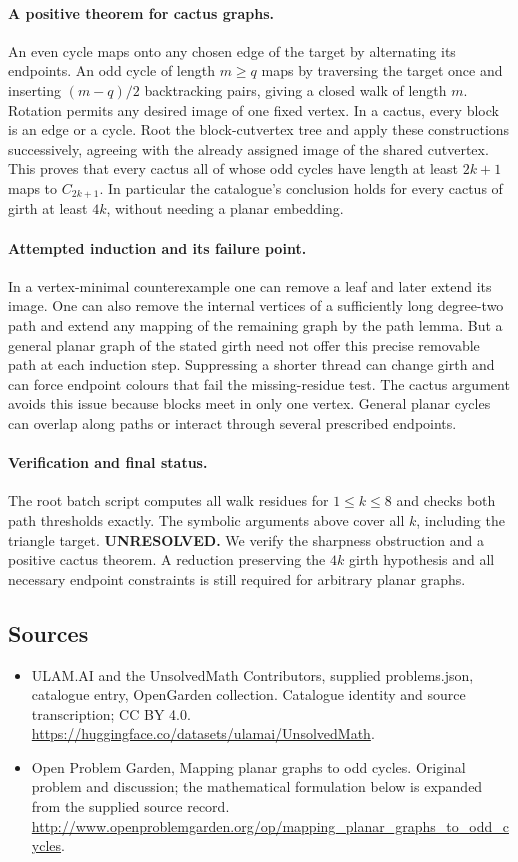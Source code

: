 \documentclass[11pt,a4paper]{article}
\begin{document}
\paragraph{A positive theorem for cactus graphs.}
An even cycle maps onto any chosen edge of the target by alternating its
endpoints. An odd cycle of length $m\ge q$ maps by traversing the target
once and inserting $(m-q)/2$ backtracking pairs, giving a closed walk of
length $m$. Rotation permits any desired image of one fixed vertex.
In a cactus, every block is an edge or a cycle. Root the block-cutvertex
tree and apply these constructions successively, agreeing with the
already assigned image of the shared cutvertex. This proves that every
cactus all of whose odd cycles have length at least $2k+1$ maps to
$C_{2k+1}$. In particular the catalogue's conclusion holds for every
cactus of girth at least $4k$, without needing a planar embedding.

\paragraph{Attempted induction and its failure point.}
In a vertex-minimal counterexample one can remove a leaf and later extend
its image. One can also remove the internal vertices of a sufficiently
long degree-two path and extend any mapping of the remaining graph by
the path lemma. But a general planar graph of the stated girth need not
offer this precise removable path at each induction step. Suppressing a
shorter thread can change girth and can force endpoint colours that fail
the missing-residue test. The cactus argument avoids this issue because
blocks meet in only one vertex. General planar cycles can overlap along
paths or interact through several prescribed endpoints.

\paragraph{Verification and final status.}
The root batch script computes all walk residues for $1\le k\le8$ and
checks both path thresholds exactly. The symbolic arguments above cover
all $k$, including the triangle target. \textbf{UNRESOLVED.} We verify the
sharpness obstruction and a positive cactus theorem. A reduction preserving
the $4k$ girth hypothesis and all necessary endpoint constraints is still
required for arbitrary planar graphs.

\subsection{Sources}
\begin{itemize}
\item[S1] ULAM.AI and the UnsolvedMath Contributors, supplied problems.json, catalogue entry, OpenGarden collection. Catalogue identity and source transcription; CC BY 4.0.
\url{https://huggingface.co/datasets/ulamai/UnsolvedMath}.
\item[S2] Open Problem Garden, Mapping planar graphs to odd cycles. Original problem and discussion; the mathematical formulation below is expanded from the supplied source record.
\url{http://www.openproblemgarden.org/op/mapping_planar_graphs_to_odd_cycles}.

\end{itemize}
\end{document}

